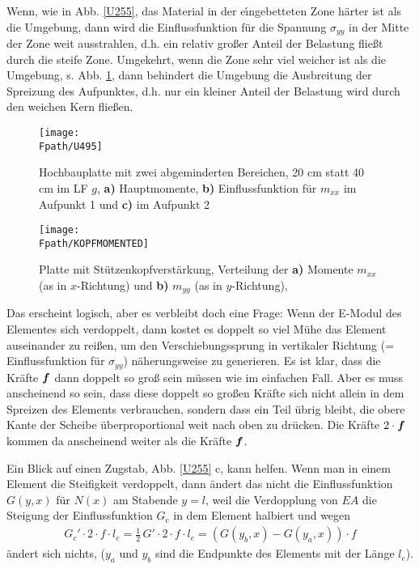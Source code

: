 {{{Wenn, wie in Abb. \ref{U255}, das Material in der e\'{\i}ngebetteten Zone h\"{a}rter ist als die Umgebung, dann wird die Einflussfunktion f\"{u}r die Spannung $\sigma_{yy}$ in der Mitte der Zone weit ausstrahlen, d.h. ein relativ gro{\ss}er Anteil der Belastung flie{\ss}t durch die steife Zone. Umgekehrt, wenn die Zone sehr viel weicher ist als die Umgebung, s. Abb. \ref{UE324}, dann behindert die Umgebung die Ausbreitung der Spreizung des Aufpunktes, d.h. nur ein kleiner Anteil der Belastung wird durch den weichen Kern flie{\ss}en.
\begin{figure}
\centering
{\texttt{[image: \\Fpath/U495]}}
  \caption{Hochbauplatte mit zwei abgeminderten Bereichen, 20 cm statt 40 cm im LF $g$, {\bf a)} Hauptmomente, {\bf b)} Einflussfunktion f\"{u}r $m_{xx}$ im Aufpunkt 1 und {\bf c)} im Aufpunkt 2} \label{UE324}
\end{figure}
\begin{figure}
\centering
{\texttt{[image: \\Fpath/KOPFMOMENTED]}}
  \caption{Platte mit St\"{u}tzenkopfverst\"{a}rkung, Verteilung der \textbf{a)} Momente $m_{xx}$ (as in $x$-Richtung) und  \textbf{b)} $m_{yy}$ (as in $y$-Richtung), \cite{Ha5}} \label{Kopfmomente}
\end{figure}
Das erscheint logisch, aber es verbleibt doch eine Frage: Wenn der E-Modul des Elementes sich verdoppelt, dann kostet es doppelt so viel M\"{u}he das Element auseinander zu rei{\ss}en, um den Verschiebungssprung in vertikaler Richtung (= Einflussfunktion f\"{u}r $\sigma_{yy}$) n\"{a}herungsweise zu generieren. Es ist klar, dass die Kr\"{a}fte $\mbox{\boldmath $f$}$ dann doppelt so gro{\ss} sein m\"{u}ssen wie im einfachen Fall. Aber es muss anscheinend so sein, dass diese doppelt so gro{\ss}en Kr\"{a}fte sich nicht allein in dem Spreizen des Elements verbrauchen, sondern dass ein Teil \"{u}brig bleibt, die obere Kante der Scheibe \"{u}berproportional weit nach oben zu dr\"{u}cken. Die Kr\"{a}fte $2 \cdot \mbox{\boldmath $f$}$ kommen da anscheinend weiter als die Kr\"{a}fte $\mbox{\boldmath $f$}$.


Ein Blick auf einen Zugstab, Abb. \ref{U255} c, kann helfen. Wenn man in einem Element die Steifigkeit verdoppelt, dann \"{a}ndert das nicht die Einflussfunktion $G(y,x)$ f\"{u}r $N(x)$ am Stabende $y = l$, weil die Verdopplung von $EA$ die Steigung der Einflussfunktion $G_c$ in dem Element halbiert und wegen
\begin{align}
G_c' \cdot 2 \cdot f \cdot l_e = \frac{1}{2}\, G' \cdot 2 \cdot f \cdot l_e = (G(y_b,x) - G(y_a,x)) \cdot f
\end{align}
\"{a}ndert sich nichts, ($y_a$ und $y_b$ sind die Endpunkte des Elements mit der L\"{a}nge $l_e$).

}}}
